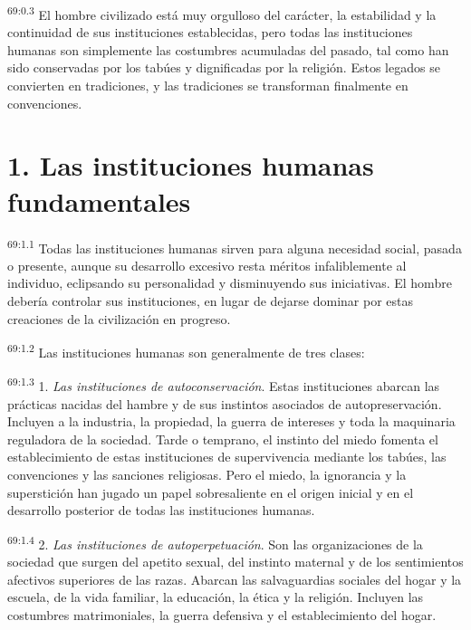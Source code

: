 \documentclass[twoside, 11pt]{book}
\begin{document}
\par
\textsuperscript{69:0.3} El hombre civilizado está muy orgulloso del carácter, la estabilidad y la continuidad de sus instituciones establecidas, pero todas las instituciones humanas son simplemente las costumbres acumuladas del pasado, tal como han sido conservadas por los tabúes y dignificadas por la religión. Estos legados se convierten en tradiciones, y las tradiciones se transforman finalmente en convenciones.

\section*{1. Las instituciones humanas fundamentales}
\par
\textsuperscript{69:1.1} Todas las instituciones humanas sirven para alguna necesidad social, pasada o presente, aunque su desarrollo excesivo resta méritos infaliblemente al individuo, eclipsando su personalidad y disminuyendo sus iniciativas. El hombre debería controlar sus instituciones, en lugar de dejarse dominar por estas creaciones de la civilización en progreso.

\par
\textsuperscript{69:1.2} Las instituciones humanas son generalmente de tres clases:

\par
\textsuperscript{69:1.3} 1. \textit{Las instituciones de autoconservación}. Estas instituciones abarcan las prácticas nacidas del hambre y de sus instintos asociados de autopreservación. Incluyen a la industria, la propiedad, la guerra de intereses y toda la maquinaria reguladora de la sociedad. Tarde o temprano, el instinto del miedo fomenta el establecimiento de estas instituciones de supervivencia mediante los tabúes, las convenciones y las sanciones religiosas. Pero el miedo, la ignorancia y la superstición han jugado un papel sobresaliente en el origen inicial y en el desarrollo posterior de todas las instituciones humanas.

\par
\textsuperscript{69:1.4} 2. \textit{Las instituciones de autoperpetuación}. Son las organizaciones de la sociedad que surgen del apetito sexual, del instinto maternal y de los sentimientos afectivos superiores de las razas. Abarcan las salvaguardias sociales del hogar y la escuela, de la vida familiar, la educación, la ética y la religión. Incluyen las costumbres matrimoniales, la guerra defensiva y el establecimiento del hogar.
\end{document}

